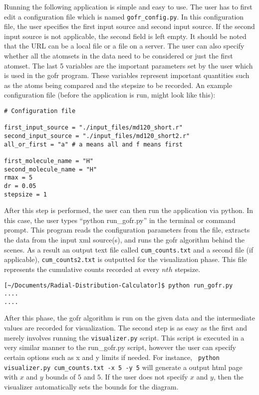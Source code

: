 Running the following application is simple and easy to use. The user has to first edit a configuration file which is named \verb|gofr_config.py|. In this configuration file, the user specifies the first input source and second input source. If the second input source is not applicable, the second field is left empty. It should be noted that the URL can be a local file or a file on a server. The user can also specify whether all the atomsets in the data need to be considered or just the first atomset. The last 5 variables are the important parameters set by the user which is used in the gofr program. These variables represent important quantities such as the atoms being compared and the stepsize to be recorded. An example configuration file (before the application is run, might look like this):

\begin{verbatim}
# Configuration file

first_input_source = "./input_files/md120_short.r"
second_input_source = "./input_files/md120_short2.r"
all_or_first = "a" # a means all and f means first

first_molecule_name = "H"
second_molecule_name = "H"
rmax = 5
dr = 0.05
stepsize = 1
\end{verbatim}


After this step is performed, the user can then run the application via python. In this case, the user types ``python run\_gofr.py'' in the terminal or command prompt. This program reads the configuration parameters from the file, extracts the data from the input xml source(s), and runs the gofr algorithm behind the scenes. As a result an output text file called \verb|cum_counts.txt| and a second file (if applicable), \verb|cum_counts2.txt| is outputted for the visualization phase. This file represents the cumulative counts recorded at every $nth$ stepsize. 


\begin{verbatim}
[~/Documents/Radial-Distribution-Calculator]$ python run_gofr.py
....
....
\end{verbatim}

After this phase, the gofr algorithm is run on the given data and the intermediate values are recorded for visualization. The second step is as easy as the first and merely involves running the \verb|visualizer.py| script. This script is executed in a very similar manner to the run\_gofr.py script, however the user can specify certain options such as x and y limits if needed. For instance, \verb| python visualizer.py cum_counts.txt -x 5 -y 5| will generate a output html page with $x$ and $y$ bounds of $5$ and $5$. If the user does not specify $x$ and $y$, then the visualizer automatically sets the bounds for the diagram.

